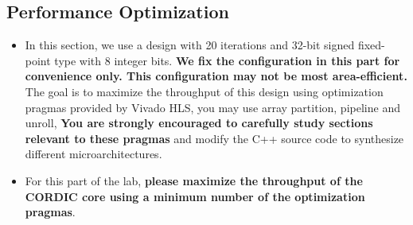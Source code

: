 \documentclass[paper=letter, fontsize=11.6pt]{scrartcl} %
\numberwithin{equation}{section} %
\numberwithin{figure}{section} %
\numberwithin{table}{section} %
\begin{document}
\begin{itemize}

	\end{itemize}

\subsection{Performance Optimization}
	\begin{itemize}
		
	\item In this section, we use a design with 20 iterations and 32-bit signed fixed-point type with 8 integer bits. \textbf{We fix the configuration in this part for convenience only. This configuration may not be most area-efficient.} The goal is to maximize the throughput of this design using optimization pragmas provided by Vivado HLS, you may use array partition, pipeline and unroll,  \textbf{You are strongly encouraged to carefully study sections relevant to these pragmas} and modify the C++ source code to synthesize different microarchitectures.
	
	\item For this part of the lab, \textbf{please maximize the throughput of the CORDIC core using a minimum number of the optimization pragmas}.
		
	\end{itemize}
	
\end{document}
